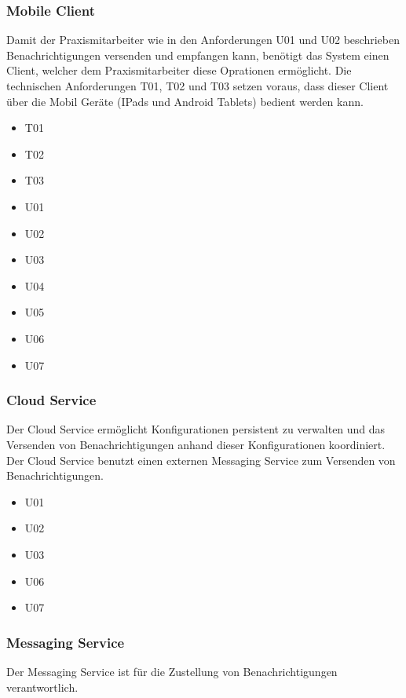 \clearpage

\subsubsection*{Mobile Client}

Damit der Praxismitarbeiter wie in den Anforderungen U01 und U02 beschrieben Benachrichtigungen versenden und empfangen kann,
benötigt das System einen Client, welcher dem Praxismitarbeiter diese Oprationen ermöglicht. Die technischen Anforderungen
T01, T02 und T03 setzen voraus, dass dieser Client über die Mobil Geräte (IPads und Android Tablets) bedient werden kann.

\begin{itemize}
    \item T01
    \item T02
    \item T03
    \item U01
    \item U02
    \item U03
    \item U04
    \item U05
    \item U06
    \item U07
\end{itemize}

\subsubsection*{Cloud Service}

Der Cloud Service ermöglicht Konfigurationen persistent zu verwalten und das Versenden von Benachrichtigungen anhand dieser Konfigurationen koordiniert.
Der Cloud Service benutzt einen externen Messaging Service zum Versenden von Benachrichtigungen.

\begin{itemize}
    \item U01
    \item U02
    \item U03
    \item U06
    \item U07
\end{itemize}


\subsubsection*{Messaging Service}

Der Messaging Service ist für die Zustellung von Benachrichtigungen verantwortlich.

